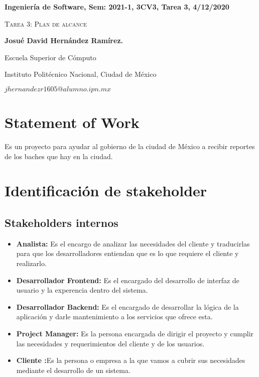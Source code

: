 \documentclass[12pt,twoside, a4paper]{article}
\date{}
\begin{document}
\centerline{\bf Ingeniería de Software, Sem: 2021-1, 3CV3, Tarea 3, 4/12/2020}
\centerline{}
\centerline{}
\begin{center}
\Large{\textsc{Tarea 3: Plan de alcance}}
\end{center}
\centerline{}
\centerline{\bf {Josu\'e David Hern\'andez Ram\'irez.}}
\centerline{}
\centerline{Escuela Superior de C\'omputo}
\centerline{Instituto Polit\'ecnico Nacional, Ciudad de M\'exico}
\centerline{$jhernandezr1605@alumno.ipn.mx$}
\newtheorem{Theorem}{\quad Theorem}[section]
\newtheorem{Definition}[Theorem]{\quad Definition}
\newtheorem{Corollary}[Theorem]{\quad Corollary}
\newtheorem{Lemma}[Theorem]{\quad Lemma}
\newtheorem{Example}[Theorem]{\quad Example}
\bigskip

\section{Statement of Work}
Es un proyecto para ayudar al gobierno de la ciudad de México a recibir reportes de los
baches que hay en la ciudad.

\section{Identificación de stakeholder}
\subsection{Stakeholders internos}
\begin{itemize}
    \item \textbf{Analista: }Es el encargo de analizar las necesidades del cliente
        y traducirlas para que los desarrolladores entiendan que es lo que
        requiere el cliente y realizarlo.
    \item \textbf{Desarrollador Frontend: }Es el encargado del desarrollo de
        interfaz de usuario y la experencia dentro del sistema.
    \item \textbf{Desarrollador Backend: }Es el encargado de desarrollar
        la lógica de la aplicación y darle mantenimiento a los servicios que
        ofrece esta.
    \item \textbf{Project Manager: }Es la persona encargada de dirigir el proyecto
        y cumplir las necesidades y requerimientos del cliente y de los usuarios.
    \item \textbf{Cliente :}Es la persona o empresa a la que vamos a cubrir sus 
        necesidades mediante el desarrollo de un sistema.
\end{itemize}
\end{document}
